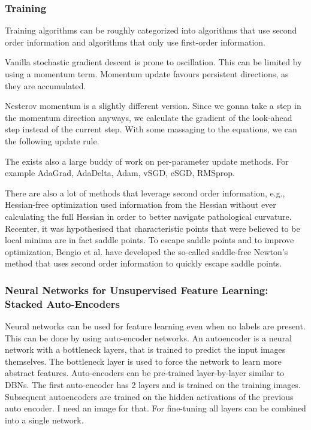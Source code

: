 \documentclass{report}
\begin{document}

\subsubsection{Training}

Training algorithms can be roughly categorized into algorithms that use second
order information and algorithms that only use first-order information.

Vanilla stochastic gradient descent is prone to oscillation. This can be limited
by using a momentum term. Momentum update favours persistent directions, as they
are accumulated.

Nesterov momentum is a slightly different version. Since we gonna take a step in
the momentum direction anyways, we calculate the gradient of the look-ahead step
instead of the current step. With some massaging to the equations, we can the
following update rule.

The exists also a large buddy of work on per-parameter update methods. For
example AdaGrad, AdaDelta, Adam, vSGD, eSGD, RMSprop.

There are also a lot of methods that leverage second order information, e.g.,
Hessian-free optimization used information from the Hessian without ever
calculating the full Hessian in order to better navigate pathological curvature.
Recenter, it was hypothesised that characteristic points that were believed to
be local minima are in fact saddle points. To escape saddle points and to
improve optimization, Bengio et al. have developed the so-called saddle-free
Newton's method that uses second order information to quickly escape saddle
points.

\subsubsection{Neural Networks for Unsupervised Feature Learning: Stacked
Auto-Encoders}

Neural networks can be used for feature learning even when no labels are
present. This can be done by using auto-encoder networks. An autoencoder is a
neural network with a bottleneck layers, that is trained to predict the input
images themselves. The bottleneck layer is used to force the network to learn
more abstract features. Auto-encoders can be pre-trained layer-by-layer similar
to DBNs. The first auto-encoder has 2 layers and is trained on the training
images. Subsequent autoencoders are trained on the hidden activations of the
previous auto encoder. I need an image for that. For fine-tuning all layers can
be combined into a single network.
\end{document}

